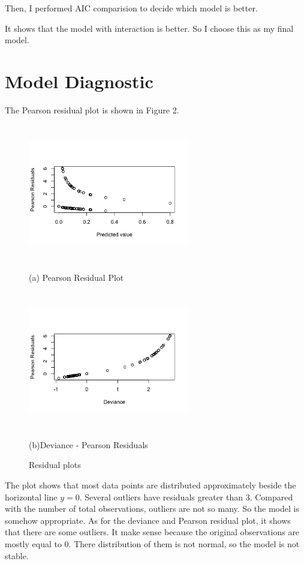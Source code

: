 \documentclass[letterpaper,12pt]{article}
\newcommand{\sihao}{\fontsize{14pt}{\baselineskip}\selectfont}       %
\begin{document}
\noindent Then, I performed AIC comparision  to decide which model is better.


\noindent It shows that the model with interaction is better. So I choose this as my final model.

\section*{\sihao Model Diagnostic}
The Pearson residual plot is shown in Figure 2.
\begin{center}
\begin{figure}[h]
\begin{minipage}{0.48\linewidth}
  \centerline{\includegraphics[width=7.0cm, height = 6cm]{log_res_lead.png}}
  \centerline{(a) Pearson Residual Plot}
\end{minipage}
\hfill
\begin{minipage}{.48\linewidth}
  \centerline{\includegraphics[width=7.0cm, height = 6cm]{Dev_res.png}}
  \centerline{(b)Deviance - Pearson Residuals}
\end{minipage}
\vfill
\caption{Residual plots}
\label{fig:res}
\end{figure}
\end{center}
The plot shows that most data points are distributed approximately beside the horizontal line $y = 0$. Several outliers have residuals greater than 3. Compared with the number of total observations, outliers are not so many. So the model is somehow appropriate. As for the deviance and Pearson residual plot, it shows that there are some outliers. It make sense because the original observations are mostly equal to 0. There distribution of them is not normal, so the model is not stable.
\end{document}
